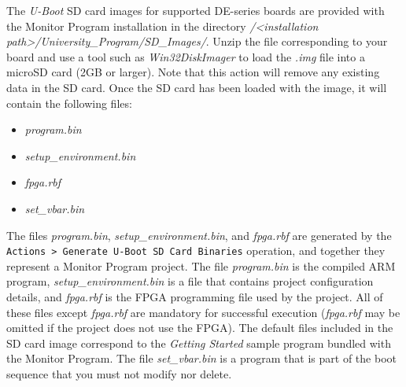\documentclass[11pt, twoside, pdftex]{article}
\begin{document}
 

The \textit{U-Boot} SD card images for supported DE-series boards are provided with the Monitor Program installation in the directory \textit{/<installation path>/University\_Program/SD\_Images/}. Unzip the file corresponding to your board and use a tool such as \textit{Win32DiskImager} to load the \textit{.img} file into a microSD card (2GB or larger). Note that this action will remove any existing data in the SD card. Once the SD card has been loaded with the image, it will contain the following files:

\begin{itemize}
\item \textit{program.bin}
\item \textit{setup\_environment.bin}
\item \textit{fpga.rbf}
\item \textit{set\_vbar.bin}
\end{itemize}

The files \textit{program.bin}, \textit{setup\_environment.bin}, and \textit{fpga.rbf} are generated by the \texttt{Actions > Generate U-Boot SD Card Binaries} operation, and together they represent a Monitor Program project. The file \textit{program.bin} is the compiled ARM program, \textit{setup\_environment.bin} is a file that contains project configuration details, and \textit{fpga.rbf} is the FPGA programming file used by the project. All of these files except \textit{fpga.rbf} are mandatory for successful execution (\textit{fpga.rbf} may be omitted if the project does not use the FPGA). The default files included in the SD card image correspond to the \textit{Getting Started} sample program bundled with the Monitor Program. The file \textit{set\_vbar.bin} is a program that is part of the boot sequence that you must not modify nor delete.

\end{document}
